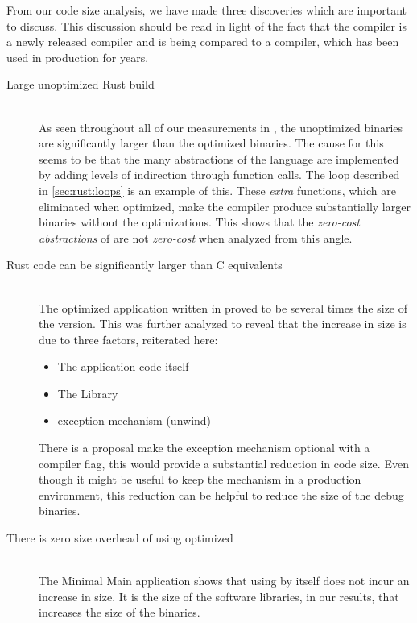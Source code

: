 From our code size analysis, we have made three discoveries which are important to discuss.
This discussion should be read in light of the fact that the {\rust} compiler is a newly released compiler and is being compared to a {\C} compiler, which has been used in production for years.

\begin{description}

\item [Large unoptimized Rust build] \hfill \\
  As seen throughout all of our measurements in {\rust}, the unoptimized binaries are significantly larger than the optimized binaries.
  The cause for this seems to be that the many abstractions of the {\rust} language are implemented by adding levels of indirection through function calls.
  The  loop described in \autoref{sec:rust:loops} is an example of this.
  These \emph{extra} functions, which are eliminated when optimized, make the compiler produce substantially larger binaries without the optimizations.
  This shows that the \emph{zero-cost abstractions} of {\rust} are not \emph{zero-cost} when analyzed from this angle.

\item [Rust code can be significantly larger than C equivalents] \hfill \\
  The optimized {\tracker} application written in {\rust} proved to be several times the size of the {\C} version.
  This was further analyzed to reveal that the increase in size is due to three factors, reiterated here:
\begin{itemize}
\item The application code itself
\item The {\rust} Library
\item {\rust} exception mechanism (unwind)
\end{itemize}
There is a proposal make the exception mechanism optional with a compiler flag, this would provide a substantial reduction in code size.
Even though it might be useful to keep the mechanism in a production environment, this reduction can be helpful to reduce the size of the debug binaries.

\item [There is zero size overhead of using optimized {\rust}] \hfill \\
  The Minimal Main application shows that using {\rust} by itself does not incur an increase in size.
  It is the size of the software libraries, in our results, that increases the size of the {\rust} binaries.

\end{description}

